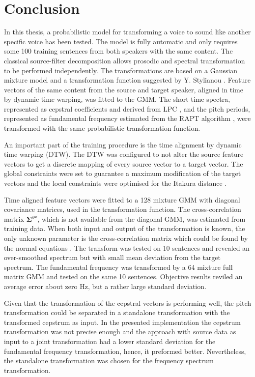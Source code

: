 \chapter{Conclusion} %
\label{cha:conclusion}

In this thesis, a probabilistic model for transforming a voice to sound like another specific voice has been tested. The model is fully automatic and only requires some 100 training sentences from both speakers with the same content. The classical source-filter decomposition allows prosodic and spectral transformation to be performed independently. The transformations are based on a Gaussian mixture model and a transformation function suggested by Y. Stylianou \cite{stylianou98}. Feature vectors of the same content from the source and target speaker, aligned in time by dynamic time warping, was fitted to the GMM. The short time spectra, represented as cepstral coefficients and derived from LPC \cite{atal68}, and the pitch periods, represented as fundamental frequency estimated from the RAPT algorithm \cite{talkin95}, were transformed with the same probabilistic transformation function.

An important part of the training procedure is the time alignment by dynamic time warping (DTW). The DTW was configured to not alter the source feature vectors to get a discrete mapping of every source vector to a target vector. The global constraints were set to guarantee a maximum modification of the target vectors and the local constraints were optimised for the Itakura distance \cite{itakura75min}.

Time aligned feature vectors were fitted to a 128 mixture GMM with diagonal covariance matrices, used in the transformation function. The cross-correlation matrix $\mathbf{\Sigma}^{yx}$, which is not available from the diagonal GMM, was estimated from training data. When both input and output of the transformation is known, the only unknown parameter is the cross-correlation matrix which could be found by the normal equations \cite{strang06}. The transform was tested on 10 sentences and revealed an over-smoothed spectrum but with small mean deviation from the target spectrum. The fundamental frequency was transformed by a 64 mixture full matrix GMM and tested on the same 10 sentences. Objective results reviled an average error about zero Hz, but a rather large standard deviation.

Given that the transformation of the cepstral vectors is performing well, the pitch transformation could be separated in a standalone transformation with the transformed cepstrum as input. In the presented implementation the cepstrum transformation was not precise enough and the approach with source data as input to a joint transformation had a lower standard deviation for the fundamental frequency transformation, hence, it preformed better. Nevertheless, the standalone transformation was chosen for the frequency spectrum transformation.


